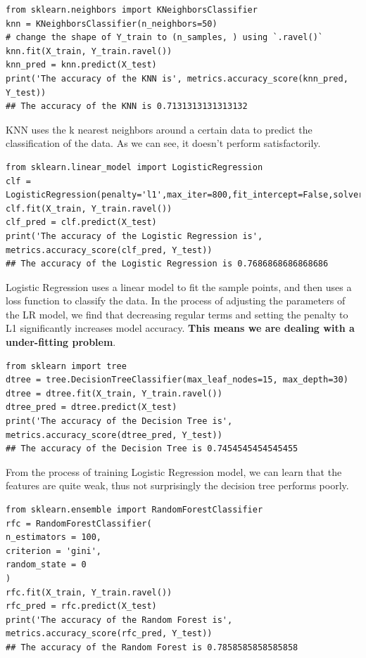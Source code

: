 \documentclass[12pt,a4paper]{article}
\begin{document}
\begin{lstlisting}
from sklearn.neighbors import KNeighborsClassifier
knn = KNeighborsClassifier(n_neighbors=50)
# change the shape of Y_train to (n_samples, ) using `.ravel()`
knn.fit(X_train, Y_train.ravel())
knn_pred = knn.predict(X_test)
print('The accuracy of the KNN is', metrics.accuracy_score(knn_pred, Y_test))
## The accuracy of the KNN is 0.7131313131313132
\end{lstlisting}

KNN uses the k nearest neighbors around a certain data to predict the classification of the data. As we can see, it doesn’t perform satisfactorily.

\begin{lstlisting}
from sklearn.linear_model import LogisticRegression
clf = LogisticRegression(penalty='l1',max_iter=800,fit_intercept=False,solver='saga',C=20)
clf.fit(X_train, Y_train.ravel())
clf_pred = clf.predict(X_test)
print('The accuracy of the Logistic Regression is', metrics.accuracy_score(clf_pred, Y_test))
## The accuracy of the Logistic Regression is 0.7686868686868686
\end{lstlisting}

Logistic Regression uses a linear model to fit the sample points, and then uses a loss function to classify the data. In the process of adjusting the parameters of the LR model, we find that decreasing regular terms and setting the penalty to L1 significantly increases model accuracy. \textbf{This means we are dealing with a under-fitting problem}. 

\begin{lstlisting}
from sklearn import tree
dtree = tree.DecisionTreeClassifier(max_leaf_nodes=15, max_depth=30)
dtree = dtree.fit(X_train, Y_train.ravel())
dtree_pred = dtree.predict(X_test)
print('The accuracy of the Decision Tree is', metrics.accuracy_score(dtree_pred, Y_test))
## The accuracy of the Decision Tree is 0.7454545454545455
\end{lstlisting}

From the process of training Logistic Regression model, we can learn that the features are quite weak, thus not surprisingly the decision tree performs poorly.

\begin{lstlisting}
from sklearn.ensemble import RandomForestClassifier
rfc = RandomForestClassifier(
n_estimators = 100,
criterion = 'gini',
random_state = 0
)
rfc.fit(X_train, Y_train.ravel())
rfc_pred = rfc.predict(X_test)
print('The accuracy of the Random Forest is', metrics.accuracy_score(rfc_pred, Y_test))
## The accuracy of the Random Forest is 0.7858585858585858
\end{lstlisting}
\end{document}
